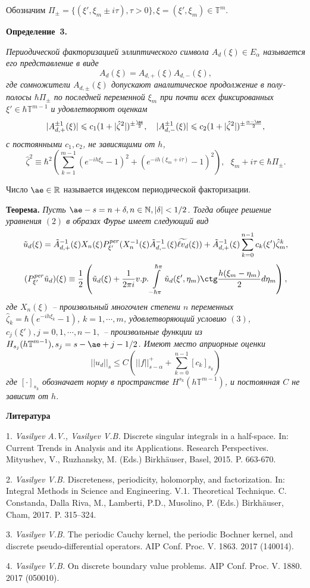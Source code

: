 Обозначим  $\Pi_{\pm}=\{(\xi',\xi_m\pm i\tau), \tau>0\}, \xi=(\xi',\xi_m)\in\mathbb T^m$.

\textbf{Определение~3.} {\it Периодической факторизацией эллиптического символа  $A_d(\xi)\in E_{\alpha}$ называется его представление в виде
\[
A_d(\xi)=A_{d,+}(\xi)A_{d,-}(\xi),
\]
где сомножители  $A_{d,\pm}(\xi)$ допускают аналитическое продолжение в полу-полосы  $\hbar\Pi_{\pm}$ по последней переменной  $\xi_m$
при почти всех фиксированных  $\xi'\in\hbar{\mathbb T}^{m-1}$ и удовлетворяют оценкам
\[
|A^{\pm 1}_{d,+}(\xi)|\leqslant c_1(1+|\hat\zeta^2|)^{\pm\frac{\ae}{2}},~~~|A^{\pm 1}_{d,-}(\xi)|\leqslant c_2(1+|\hat\zeta^2|)^{\pm\frac{{\alpha-\ae}}{2}},
\]
с постоянными $c_1, c_2$, не зависящими от $h$,
\[
\hat\zeta^2\equiv\hbar^2\left(\sum\limits_{k=1}^{m-1}(e^{-ih\xi_k}-1)^2+(e^{-ih(\xi_m+i\tau)}-1)^2\right),~~~\xi_m+i\tau\in\hbar\Pi_{\pm}.
\]

Число $\ae\in{\mathbb R}$ называется индексом периодической факторизации.

}

\textbf{Теорема.} {\it Пусть $\ae-s=n+\delta, n\in{\mathbb N}, |\delta|<1/2$. Тогда общее решение уравнения  $(2)$ в образах Фурье имеет следующий вид
\[
\tilde u_d(\xi)=\tilde A^{-1}_{d,+}(\xi)X_n(\xi)P^{\it per}_{\xi'}(X_n^{-1}(\xi)\tilde A^{-1}_{d,-}(\xi)\widetilde{\ell v_d}(\xi)) +\tilde A^{-1}_{d,+}(\xi)\sum\limits_{k=0}^{n-1}c_k(\xi')\hat\zeta_m^k,
\]
\[
(P_{\xi'}^{\it per}\tilde u_d)(\xi)\equiv\frac{1}{2}\left(\tilde u_d(\xi)+\frac{1}{2\pi i}v.p.\int\limits_{-\hbar\pi}^{\hbar\pi}{\tilde u_d(\xi',\eta_m)}\ctg\frac{h(\xi_m-\eta_m)}{2}d\eta_m\right),
\]
где $X_n(\xi)$ -- произвольный многочлен степени  $n$ переменных $\hat\zeta_k=\hbar(e^{-ih\xi_k}-1)$, $k=1,\cdots,m$, удовлетворяющий условию  $(3)$, $c_j(\xi'), j=0,1,\cdots,n-1,$ -- произвольные функции из  $H_{s_j}({h\mathbb T}^{m-1}), s_j=s-\ae+j-1/2$. Имеют место априорные оценки
\[
||u_d||_s\leqslant C(||f||^+_{s-\alpha}+\sum\limits_{k=0}^{n-1}[c_k]_{s_k})
\]
где $[\cdot]_{s_k}$ обозначает норму в пространстве $H^{s_k}({h\mathbb T}^{m-1})$, и постоянная $C$ не зависит от $h$.
}


\smallskip \centerline{\bf Литература}\nopagebreak

1. {\it Vasilyev A.V., Vasilyev V.B.} Discrete singular integrals in a half-space. In:
             Current Trends in Analysis and its Applications. Research Perspectives. Mityushev, V., Ruzhansky, M. (Eds.) Birkh\"auser, Basel, 2015. P. 663-670.

2. {\it	Vasilyev V.B.} Discreteness, periodicity, holomorphy, and factorization. In: Integral Methods in Science and Engineering. V.1. Theoretical Technique.  C. Constanda, Dalla Riva, M., Lamberti, P.D., Musolino, P. (Eds.)  Birkh\"auser, Cham, 2017. P. 315--324.

3. {\it Vasilyev V.B.} The periodic Cauchy kernel, the periodic Bochner kernel, and discrete pseudo-differential operators. AIP Conf. Proc.  V. 1863. 2017 (140014).

4. {\it Vasilyev V.B.} On discrete boundary value problems. AIP Conf. Proc. V. 1880. 2017 (050010).

